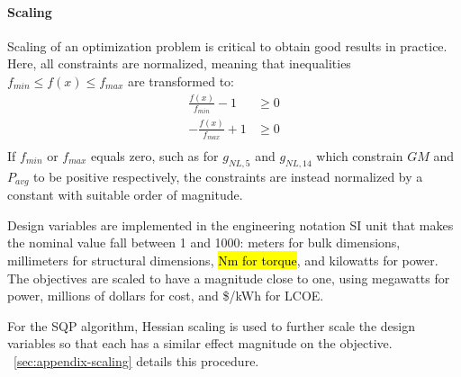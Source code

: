 \paragraph{Scaling}
Scaling of an optimization problem is critical to obtain good results in practice.
Here, all constraints are normalized, meaning that inequalities $f_{min} \leq f(x) \leq f_{max}$ are transformed to:
\begin{equation}
\begin{aligned}
    \frac{f(x)}{f_{min}}-1 &\geq 0 \\
    -\frac{f(x)}{f_{max}}+1 &\geq 0 \\
\end{aligned}
\end{equation}
If $f_{min}$ or $f_{max}$ equals zero, such as for $g_{NL,5}$ and $g_{NL,14}$ which constrain $GM$ and $P_{avg}$ to be positive respectively, the constraints are instead normalized by a constant with suitable order of magnitude.

Design variables are implemented in the engineering notation SI unit that makes the nominal value fall between 1 and 1000: meters for bulk dimensions, millimeters for structural dimensions, \hl{Nm for torque}, and kilowatts for power.
The objectives are scaled to have a magnitude close to one, using megawatts for power, millions of dollars for cost, and \$/kWh for LCOE.

For the SQP algorithm, Hessian scaling is used to further scale the design variables so that each has a similar effect magnitude on the objective.
\appendixname~\ref{sec:appendix-scaling} details this procedure. 

